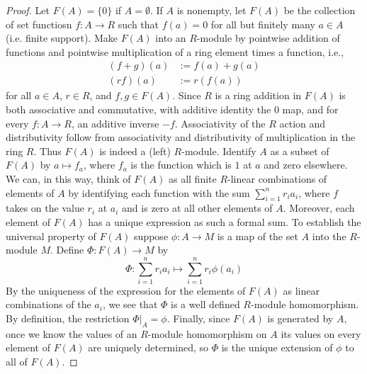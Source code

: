 \begin{proof}
    Let $F(A) = \{0\}$ if $A = \emptyset$. If $A$ is nonempty, let $F(A)$ be the collection of set functiosn $f:A\rightarrow R$ such that $f(a) = 0$ for all but finitely many $a \in A$ (i.e. finite support). Make $F(A)$ into an $R$-module by pointwise addition of functions and pointwise multiplication of a ring element times a function, i.e., \begin{align*}
        (f+g)(a) &:= f(a)+g(a) \\
        (rf)(a) &:= r(f(a)) 
    \end{align*}
    for all $a \in A$, $r \in R$, and $f,g \in F(A)$. Since $R$ is a ring addition in $F(A)$ is both associative and commutative, with additive identity the $0$ map, and for every $f:A\rightarrow R$, an additive inverse $-f$. Associativity of the $R$ action and distributivity follow from associativity and distributivity of multiplication in the ring $R$. Thus $F(A)$ is indeed a (left) $R$-module. Identify $A$ as a subset of $F(A)$ by $a \mapsto f_a$, where $f_a$ is the function which is $1$ at $a$ and zero elsewhere. We can, in this way, think of $F(A)$ as all finite $R$-linear combinations of elements of $A$ by identifying each function with the sum $\sum_{i=1}^nr_ia_i$, where $f$ takes on the value $r_i$ at $a_i$ and is zero at all other elements of $A$. Moreover, each element of $F(A)$ has a unique expression as such a formal sum. To establish the universal property of $F(A)$ suppose $\phi:A\rightarrow M$ is a map of the set $A$ into the $R$-module $M$. Define $\Phi:F(A)\rightarrow M$ by \begin{equation*}
        \Phi:\sum\limits_{i=1}^nr_ia_i\mapsto\sum\limits_{i=1}^nr_i\phi(a_i)
    \end{equation*}
    By the uniqueness of the expression for the elements of $F(A)$ as linear combinations of the $a_i$, we see that $\Phi$ is a well defined $R$-module homomorphism. By definition, the restriction $\Phi\vert_A = \phi$. Finally, since $F(A)$ is generated by $A$, once we know the values of an $R$-module homomorphism on $A$ its values on every element of $F(A)$ are uniquely determined, so $\Phi$ is the unique extension of $\phi$ to all of $F(A)$.
\end{proof}

